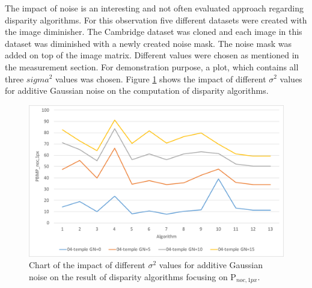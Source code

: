The impact of noise is an interesting and not often evaluated approach regarding disparity algorithms.
For this observation five different datasets were created with the image diminisher.
The Cambridge dataset was cloned and each image in this dataset was diminished with a newly created noise mask.
The noise mask was added on top of the image matrix.
Different values were chosen as mentioned in the measurement section.
For demonstration purpose, a plot, which contains all three $sigma^2$ values was chosen.
Figure \ref{fig:eval-plots-gn-overview} shows the impact of different $\sigma^2$ values for additive Gaussian noise on the computation of disparity algorithms.

\begin{figure}[h!]
\centering
\includegraphics[width=1.0\textwidth]{src/images/evaluation/plots/04-temple-gn-overview.pdf}
\caption[Chart of the impact of Gaussian noise]{Chart of the impact of different $\sigma^2$ values for additive Gaussian noise on the result of disparity algorithms focusing on P$_{noc,1px}$.}
\label{fig:eval-plots-gn-overview}
\end{figure}

